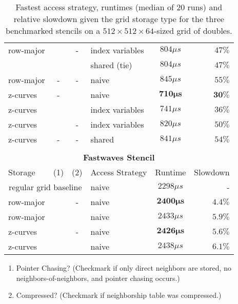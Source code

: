 \begin{table}
\begin{tabular}{l c c l c r}
		 row-major & \checkmark & - & index variables & $804\mu s$ & $47\%$ \\
		 &   & &  shared (tie) & $804\mu s$ & $47\%$ \\
		 row-major & - & - & naive & $845 \mu s$ & $55 \%$ \\
		\hline
		 z-curves & - & \checkmark & naive & $\mathbf{710 \mu s}$ & $\mathbf{30 \%}$ \\
		 z-curves & \checkmark & \checkmark & index variables & $741 \mu s$ & $36 \%$ \\
		 z-curves & \checkmark & - & index variables & $820\mu s$ &  $50 \%$ \\
		 z-curves & - & - & shared & $841 \mu s$ & $54 \%$ \\
		
		\hline
		\hline\\
		\multicolumn{6}{c}{\textbf{Fastwaves Stencil}}\\
		\hline
		\hline
		Storage & (1) & (2) & Access Strategy  & Runtime & Slowdown \\
		\hline
		\multicolumn{3}{c}{regular grid baseline} & naive & $2298 \mu s$ & - \\
		\hline
		row-major & & - & naive & $\mathbf{2400\mu s}$ & $\mathbf{4.4 \%}$ \\
		row-major & & \checkmark & naive & $2433\mu s$ & $5.9 \%$ \\
		\hline
		z-curves & & - & naive & $\mathbf{2426\mu s}$ & $\mathbf{5.6 \%}$ \\
		z-curves & & \checkmark & naive & $2438\mu s$ & $6.1 \%$ \\
		\hline\hline
	\end{tabular}
	\begin{enumerate}[label=(\arabic*)]
		\item Pointer Chasing? (Checkmark if only direct neighbors are stored, no neighbors-of-neighbors, and pointer chasing occurs.)
		\item Compressed? (Checkmark if neighborship table was compressed.)
	\end{enumerate}
	\caption{\label{tab:overview} Fastest access strategy, runtimes (median of 20 runs) and relative slowdown given the grid storage type for the three benchmarked stencils on a $512\times 512\times 64$-sized grid of doubles.}
\end{table}

